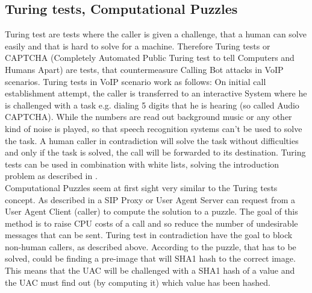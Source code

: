 \documentclass[final
	]{issa}
\begin{document}
\subsection{Turing tests, Computational Puzzles}
Turing test are tests where the caller is given a challenge, that a human can solve easily and that is hard to solve for a machine. Therefore Turing tests or CAPTCHA (Completely Automated Public Turing test to tell Computers and Humans Apart) are tests, that countermeasure Calling Bot attacks in VoIP scenarios. Turing tests in VoIP scenario work as follows: On initial call establishment attempt, the caller is transferred to an interactive System where he is challenged with a task e.g. dialing 5 digits that he is hearing (so called Audio CAPTCHA). While the numbers are read out background music or any other kind of noise is played, so that speech recognition systems can't be used to solve the task. A human caller in contradiction will solve the task without difficulties and only if the task is solved, the call will be forwarded to its destination. Turing tests can be used in combination with white lists, solving the introduction problem as described in \cite{rfcdraft:audiocaptcha}.\\
Computational Puzzles seem at first sight very similar to the Turing tests concept. As described in \cite{rfcdraft:comppuzz} a SIP Proxy or User Agent Server can request from a User Agent Client (caller) to compute the solution to a puzzle. The goal of this method is to raise CPU costs of a call and so reduce the number of undesirable messages that can be sent. Turing test in contradiction have the goal to block non-human callers, as described above. According to \cite{rfcdraft:comppuzz} the puzzle, that has to be solved, could be finding a pre-image that will SHA1 hash to the correct image. This means that the UAC will be challenged with a SHA1 hash of a value and the UAC must find out (by computing it) which value has been hashed.
\end{document}

